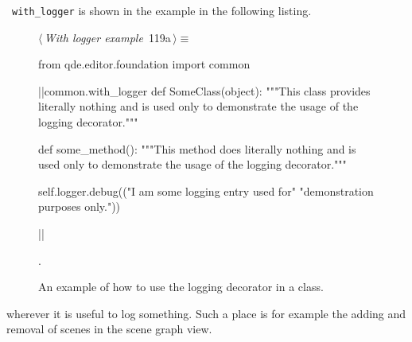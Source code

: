 \documentclass[%
    a4paper,    %
    justified,  %
    nobib,      %
    openany     %
]{tufte-book}
\makeatletter
\renewcommand{\label}[1]{\@tufte@label{##1}}%
\makeatother
\begin{document}
~\verb=with_logger= is shown in the
example in the following listing.

\begin{figure}[!htbp]
\begin{flushleft} \small
\begin{minipage}{\linewidth}\label{scrap58}\raggedright\small
{} $\langle\,${\itshape With logger example}\nobreak\ {\footnotesize {119a}}$\,\rangle\equiv$
\vspace{-1ex}
\begin{pythoncode}
from qde.editor.foundation import common

|\normalfont{}\fontfamily{}|common.with_logger
def SomeClass(object):
    """This class provides literally nothing and is used only to
    demonstrate the usage of the logging decorator."""

    def some_method():
        """This method does literally nothing and is used only to
        demonstrate the usage of the logging decorator."""

        self.logger.debug(("I am some logging entry used for"
                           "demonstration purposes only."))

|\NWsep|
\end{pythoncode}
\vspace{1.5ex}
\footnotesize
\begin{list}{}{\setlength{\itemsep}{-\parsep}\setlength{\itemindent}{-\leftmargin}}
\item {\NWtxtMacroNoRef}.

\item{}
\end{list}
\end{minipage}\vspace{4ex}
\end{flushleft}
\caption{An example of how to use the logging decorator in a class.}
\end{figure}

 wherever it is useful to log
something. Such a place is for example the adding and removal of scenes in the
scene graph view.
\end{document}
